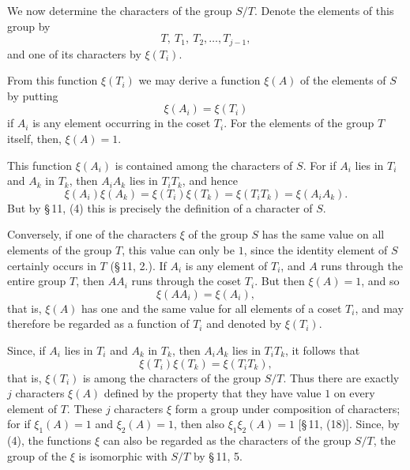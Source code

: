 \documentclass[11pt]{article}
\begin{document}
We now determine the characters of the group $S/T$. Denote the elements of this group by
\begin{equation}
T,
\ T_1,
\ T_2,
\ldots,
T_{j-1},
\tag{2}
\end{equation}
and one of its characters by $\xi(T_i)$.

From this function $\xi(T_i)$ we may derive a function $\xi(A)$ of the elements of $S$ by putting
\begin{equation}
\xi(A_i)=\xi(T_i)
\tag{3}
\end{equation}
if $A_i$ is any element occurring in the coset $T_i$. For the elements of the group $T$ itself, then, $\xi(A)=1$.

This function $\xi(A_i)$ is contained among the characters of $S$. For if $A_i$ lies in $T_i$ and $A_k$ in $T_k$, then $A_iA_k$ lies in $T_iT_k$, and hence
\begin{equation}
\xi(A_i)\xi(A_k)=\xi(T_i)\xi(T_k)=\xi(T_iT_k)=\xi(A_iA_k).
\tag{4}
\end{equation}
But by \S\,11, (4) this is precisely the definition of a character of $S$.

Conversely, if one of the characters $\xi$ of the group $S$ has the same value on all elements of the group $T$, this value can only be $1$, since the identity element of $S$ certainly occurs in $T$ (\S\,11, 2.). If $A_i$ is any element of $T_i$, and $A$ runs through the entire group $T$, then $AA_i$ runs through the coset $T_i$. But then $\xi(A)=1$, and so
\begin{equation}
\xi(AA_i)=\xi(A_i),
\tag{5}
\end{equation}
that is, $\xi(A)$ has one and the same value for all elements of a coset $T_i$, and may therefore be regarded as a function of $T_i$ and denoted by $\xi(T_i)$.

Since, if $A_i$ lies in $T_i$ and $A_k$ in $T_k$, then $A_iA_k$ lies in $T_iT_k$, it follows that
\begin{equation}
\xi(T_i)\xi(T_k)=\xi(T_iT_k),
\tag{6}
\end{equation}
that is, $\xi(T_i)$ is among the characters of the group $S/T$. Thus there are exactly $j$ characters $\xi(A)$ defined by the property that they have value $1$ on every element of $T$. These $j$ characters $\xi$ form a group under composition of characters; for if $\xi_1(A)=1$ and $\xi_2(A)=1$, then also $\xi_1\xi_2(A)=1$ [\S\,11, (18)]. Since, by (4), the functions $\xi$ can also be regarded as the characters of the group $S/T$, the group of the $\xi$ is isomorphic with $S/T$ by \S\,11, 5.
\end{document}

